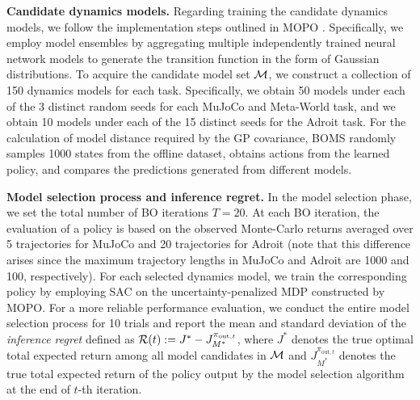 \textbf{Candidate dynamics models.} Regarding training the candidate dynamics models, we follow the implementation steps outlined in MOPO \citep{yu2020mopo}. 
Specifically, we employ model ensembles by aggregating multiple independently trained neural network models to generate the transition function in the form of Gaussian distributions. 
{To acquire the candidate model set $\operatorname{\mathcal{M}}$, we construct a collection of 150 dynamics models for each task. Specifically, we obtain 50 models under each of the 3 distinct random seeds for each MuJoCo and Meta-World task, and we obtain 10 models under each of the 15 distinct seeds for the Adroit task.
For the calculation of model distance required by the GP covariance, BOMS randomly samples 1000 states from the offline dataset, obtains actions from the learned policy, and compares the predictions generated from different models.}

\textbf{Model selection process and inference regret.} In the model selection phase, we set the total number of BO iterations $T=20$. At each BO iteration, the evaluation of a policy is based on the observed Monte-Carlo returns averaged over 5 trajectories for MuJoCo and 20 trajectories for Adroit (note that this difference arises since the maximum trajectory lengths in MuJoCo and Adroit are 1000 and 100, respectively). For each selected dynamics model, we train the corresponding policy by employing SAC \citep{haarnoja2018soft} on the uncertainty-penalized MDP constructed by MOPO. For a more reliable performance evaluation, we conduct the entire model selection process for 10 trials and report the mean and standard deviation of the \textit{inference regret} defined as $\operatorname{\mathcal{R}}(t):=J^* - J^{\pi_{\text{out},t}}_{M^*}$, where ${J^*}$ denotes the true optimal total expected return among all model candidates in $\operatorname{\mathcal{M}}$ and $J^{\pi_{\text{out},t}}_{M^*}$ denotes the true total expected return of the policy output by the model selection algorithm at the end of $t$-th iteration. 

